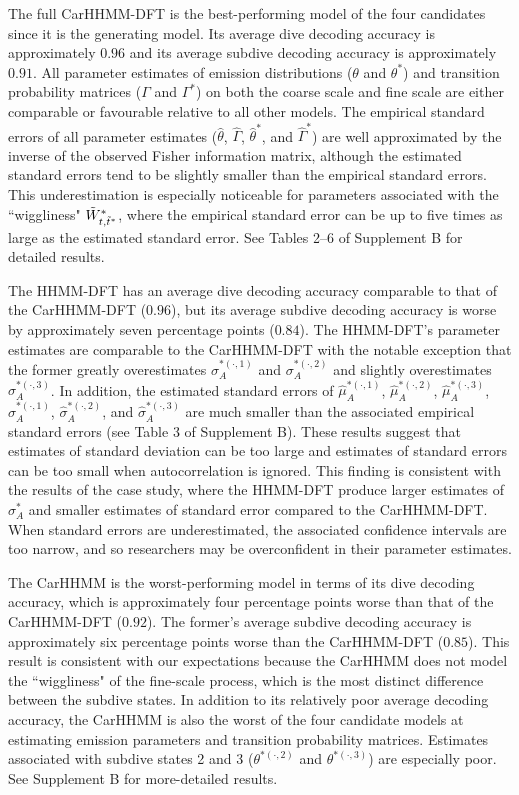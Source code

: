 The full CarHHMM-DFT is the best-performing model of the four candidates since it is the generating model. Its average dive decoding accuracy is approximately $0.96$ and its average subdive decoding accuracy is approximately $0.91$. 
All parameter estimates of emission distributions ($\theta$ and $\theta^*$) and transition probability matrices ($\Gamma$ and $\Gamma^*$) on both the coarse scale and fine scale are either comparable or favourable relative to all other models. The empirical standard errors of all parameter estimates ($\hat \theta$, $\hat \Gamma$, $\hat \theta^*$, and $\hat \Gamma^*$) are well approximated by the inverse of the observed Fisher information matrix, although the estimated standard errors tend to be slightly smaller than the empirical standard errors. This underestimation is especially noticeable for parameters associated with the ``wiggliness" $\tilde{W}^*_{t,\tilde t^*}$, where the empirical standard error can be up to five times as large as the estimated standard error. See Tables 2--6 of Supplement B for detailed results.

The HHMM-DFT has an average dive decoding accuracy comparable to that of the CarHHMM-DFT ($0.96$), but its average subdive decoding accuracy is worse by approximately seven percentage points ($0.84$). The HHMM-DFT's parameter estimates are comparable to the CarHHMM-DFT with the notable exception that the former greatly overestimates $\sigma_A^{*(\cdot,1)}$ and $\sigma_A^{*(\cdot,2)}$ and slightly overestimates $\sigma_A^{*(\cdot,3)}$. In addition, the estimated standard errors of $\hat \mu_A^{*(\cdot,1)}$, $\hat \mu_A^{*(\cdot,2)}$, $\hat \mu_A^{*(\cdot,3)}$, $\hat \sigma_A^{*(\cdot,1)}$, $\hat \sigma_A^{*(\cdot,2)}$, and $\hat \sigma_A^{*(\cdot,3)}$ are much smaller than the associated empirical standard errors (see Table 3 of Supplement B). These results suggest that estimates of standard deviation can be too large and estimates of standard errors can be too small when autocorrelation is ignored. This finding is consistent with the results of the case study, where the HHMM-DFT produce larger estimates of $\sigma_A^*$ and smaller estimates of standard error compared to the CarHHMM-DFT. When standard errors are underestimated, the associated confidence intervals are too narrow, and so researchers may be overconfident in their parameter estimates.

The CarHHMM is the worst-performing model in terms of its dive decoding accuracy, which is approximately four percentage points worse than that of the CarHHMM-DFT ($0.92$). The former's average subdive decoding accuracy is approximately six percentage points worse than the CarHHMM-DFT ($0.85$). This result is consistent with our expectations because the CarHHMM does not model the ``wiggliness" of the fine-scale process, which is the most distinct difference between the subdive states. In addition to its relatively poor average decoding accuracy, the CarHHMM is also the worst of the four candidate models at estimating emission parameters and transition probability matrices. Estimates associated with subdive states 2 and 3 ($\theta^{*(\cdot,2)}$ and $\theta^{*(\cdot,3)}$) are especially poor. See Supplement B for more-detailed results.

